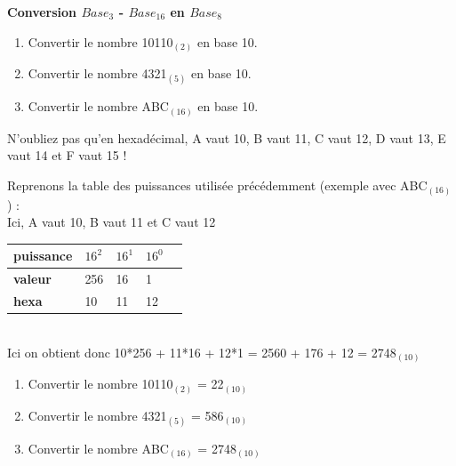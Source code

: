 \begin{Exercice}[15 minutes] \textbf{Conversion $Base_{3}$ - $Base_{16}$ en $Base_8$}
    \begin{enumerate}
        \item Convertir le nombre 10110$_{(2)}$ en base 10.
        \item Convertir le nombre 4321$_{(5)}$ en base 10.
        \item Convertir le nombre ABC$_{(16)}$ en base 10.
    \end{enumerate}
    \begin{conseil}
        
         N'oubliez pas qu'en hexadécimal, A vaut 10, B vaut 11, C vaut 12, D vaut 13, E vaut 14 et F vaut 15 ! \\
    \end{conseil}
    \begin{solution}
        Reprenons la table des puissances utilisée précédemment (exemple avec ABC$_{(16)}$) : \\
        
        Ici, A vaut 10, B vaut 11 et C vaut 12 \\
        
        \begin{tabular}{| C{0.1\textwidth} | C{0.1\textwidth} | C{0.1\textwidth} | C{0.1\textwidth} | C{0.1\textwidth} |} 
            \hline
            \textbf{puissance} & $16^{2}$ & $16^{1}$ & $16^{0}$ \\ [0.5ex] 
            \hline
            \textbf{valeur} & 256 & 16 & 1 \\ [0.5ex] 
            \hline
            \textbf{hexa} & 10 & 11 & 12 \\ [0.5ex] 
            \hline
        \end{tabular} \\
        
        Ici on obtient donc 10*256 + 11*16 + 12*1 = 2560 + 176 + 12 = 2748$_{(10)}$ \\
        
        \begin{enumerate}
        \item Convertir le nombre 10110$_{(2)}$  = 22$_{(10)}$
        \item Convertir le nombre 4321$_{(5)}$ = 586$_{(10)}$
        \item Convertir le nombre ABC$_{(16)}$ = 2748$_{(10)}$
        \end{enumerate}
    
    \end{solution}

\end{Exercice}
\newpage

